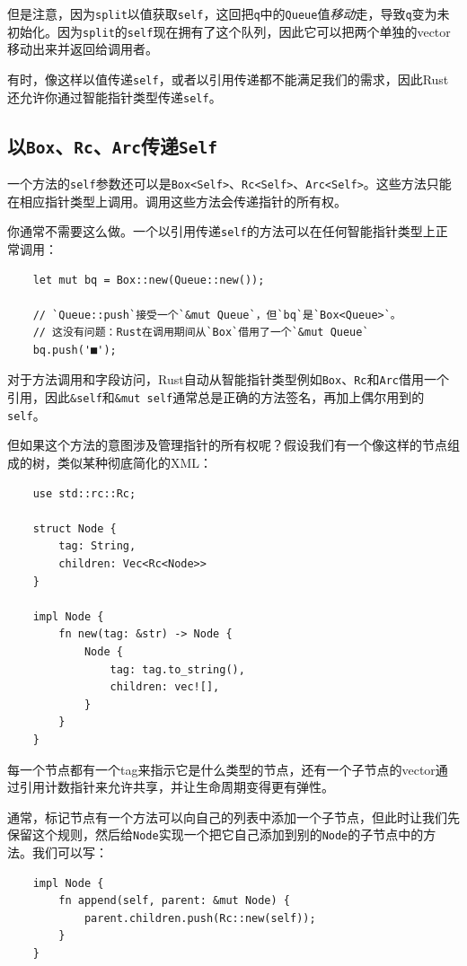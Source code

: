 但是注意，因为\texttt{split}以值获取\texttt{self}，这回把\texttt{q}中的\texttt{Queue}值\emph{移动}走，导致\texttt{q}变为未初始化。因为\texttt{split}的\texttt{self}现在拥有了这个队列，因此它可以把两个单独的vector移动出来并返回给调用者。

有时，像这样以值传递\texttt{self}，或者以引用传递都不能满足我们的需求，因此Rust还允许你通过智能指针类型传递\texttt{self}。

\subsection{以\texttt{Box}、\texttt{Rc}、\texttt{Arc}传递\texttt{Self}}

一个方法的\texttt{self}参数还可以是\texttt{Box<Self>}、\texttt{Rc<Self>}、\texttt{Arc<Self>}。这些方法只能在相应指针类型上调用。调用这些方法会传递指针的所有权。

你通常不需要这么做。一个以引用传递\texttt{self}的方法可以在任何智能指针类型上正常调用：
\begin{verbatim}
    let mut bq = Box::new(Queue::new());

    // `Queue::push`接受一个`&mut Queue`，但`bq`是`Box<Queue>`。
    // 这没有问题：Rust在调用期间从`Box`借用了一个`&mut Queue`
    bq.push('■');
\end{verbatim}

对于方法调用和字段访问，Rust自动从智能指针类型例如\texttt{Box}、\texttt{Rc}和\texttt{Arc}借用一个引用，因此\texttt{\&self}和\texttt{\&mut self}通常总是正确的方法签名，再加上偶尔用到的\texttt{self}。

但如果这个方法的意图涉及管理指针的所有权呢？假设我们有一个像这样的节点组成的树，类似某种彻底简化的XML：
\begin{verbatim}
    use std::rc::Rc;

    struct Node {
        tag: String,
        children: Vec<Rc<Node>>
    }

    impl Node {
        fn new(tag: &str) -> Node {
            Node {
                tag: tag.to_string(),
                children: vec![],
            }
        }
    }
\end{verbatim}

每一个节点都有一个tag来指示它是什么类型的节点，还有一个子节点的vector通过引用计数指针来允许共享，并让生命周期变得更有弹性。

通常，标记节点有一个方法可以向自己的列表中添加一个子节点，但此时让我们先保留这个规则，然后给\texttt{Node}实现一个把它自己添加到别的\texttt{Node}的子节点中的方法。我们可以写：
\begin{verbatim}
    impl Node {
        fn append(self, parent: &mut Node) {
            parent.children.push(Rc::new(self));
        }
    }
\end{verbatim}

